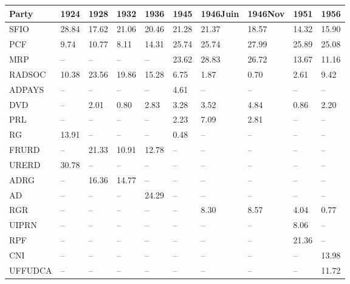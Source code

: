 \begin{tabular}{llllllllll}
  \toprule
Party & 1924 & 1928 & 1932 & 1936 & 1945 & 1946Juin & 1946Nov & 1951 & 1956 \\ 
  \midrule
SFIO & 28.84 & 17.62 & 21.06 & 20.46 & 21.28 & 21.37 & 18.57 & 14.32 & 15.90 \\ 
  PCF & 9.74 & 10.77 & 8.11 & 14.31 & 25.74 & 25.74 & 27.99 & 25.89 & 25.08 \\ 
  MRP & -- & -- & -- & -- & 23.62 & 28.83 & 26.72 & 13.67 & 11.16 \\ 
  RADSOC & 10.38 & 23.56 & 19.86 & 15.28 & 6.75 & 1.87 & 0.70 & 2.61 & 9.42 \\ 
  ADPAYS & -- & -- & -- & -- & 4.61 & -- & -- & -- & -- \\ 
  DVD & -- & 2.01 & 0.80 & 2.83 & 3.28 & 3.52 & 4.84 & 0.86 & 2.20 \\ 
  PRL & -- & -- & -- & -- & 2.23 & 7.09 & 2.81 & -- & -- \\ 
  RG & 13.91 & -- & -- & -- & 0.48 & -- & -- & -- & -- \\ 
  FRURD & -- & 21.33 & 10.91 & 12.78 & -- & -- & -- & -- & -- \\ 
  URERD & 30.78 & -- & -- & -- & -- & -- & -- & -- & -- \\ 
  ADRG & -- & 16.36 & 14.77 & -- & -- & -- & -- & -- & -- \\ 
  AD & -- & -- & -- & 24.29 & -- & -- & -- & -- & -- \\ 
  RGR & -- & -- & -- & -- & -- & 8.30 & 8.57 & 4.04 & 0.77 \\ 
  UIPRN & -- & -- & -- & -- & -- & -- & -- & 8.06 & -- \\ 
  RPF & -- & -- & -- & -- & -- & -- & -- & 21.36 & -- \\ 
  CNI & -- & -- & -- & -- & -- & -- & -- & -- & 13.98 \\ 
  UFFUDCA & -- & -- & -- & -- & -- & -- & -- & -- & 11.72 \\ 
   \bottomrule
\end{tabular}
